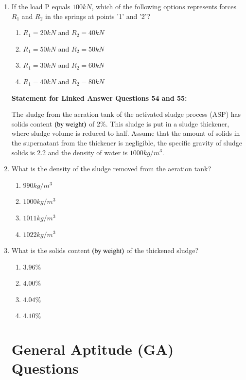 \documentclass[journal,12pt,onecolumn]{IEEEtran}
\theoremstyle{remark}
\begin{document}
\begin{enumerate}
\item If the load P equals $100 kN$, which of the following options represents forces $R_1$ and $R_2$ in the springs at points '1' and '2'?

\hfill{}
\begin{enumerate}
\item $R_1 = 20 kN$ and $R_2 = 40 kN$
\item $R_1 = 50 kN$ and $R_2 = 50 kN$
\item $R_1 = 30 kN$ and $R_2 = 60 kN$
\item $R_1 = 40 kN$ and $R_2 = 80 kN$
\end{enumerate}

\textbf{Statement for Linked Answer Questions 54 and 55:}

The sludge from the aeration tank of the activated sludge process (ASP) has solids content $\left(\text{by weight}\right)$ of $2\%$. This sludge is put in a sludge thickener, where sludge volume is reduced to half. Assume that the amount of solids in the supernatant from the thickener is negligible, the specific gravity of sludge solids is 2.2 and the density of water is $1000 kg/m^3$.

\item What is the density of the sludge removed from the aeration tank?

\hfill{}
\begin{enumerate}
\item $990 kg/m^3$
\item $1000 kg/m^3$
\item $1011 kg/m^3$
\item $1022 kg/m^3$
\end{enumerate}

\item What is the solids content $\left(\text{by weight}\right)$ of the thickened sludge?

\hfill{}
\begin{enumerate}
\item $3.96\%$
\item $4.00\%$
\item $4.04\%$
\item $4.10\%$
\end{enumerate}

\section*{General Aptitude (GA) Questions}

\end{enumerate}
\end{document}
